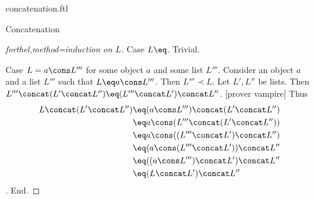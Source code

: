 \documentclass{naproche-library}
\begin{document}
\begin{smodule}{concatenation.ftl}
\begin{sfragment}{Concatenation}
\begin{proof}[forthel,method=induction on $L$]
      Case $L \eq \list{}$. Trivial.

      Case $L = a \cons L'''$ for some object $a$ and some list $L'''$.
        Consider an object $a$ and a list $L'''$ such that $L \eq a \cons L'''$.
        Then $L''' \prec L$.
        Let $L',L''$ be lists.
        Then $L''' \concat (L' \concat L'') \eq (L''' \concat L') \concat L''$.
        [prover vampire]
        Thus
        \begin{align*}
          L \concat (L' \concat L'') 
            &\eq (a \cons L''') \concat (L' \concat L'')\\
            &\eq a \cons (L''' \concat (L' \concat L''))\\
            &\eq a \cons ((L''' \concat L') \concat L'')\\
            &\eq (a \cons (L''' \concat L')) \concat L''\\
            &\eq ((a \cons L''') \concat L') \concat L''\\
            &\eq (L \concat L') \concat L''
        \end{align*}.
      End.
    \end{proof}
  \end{sfragment}
\end{smodule}
\end{document}
